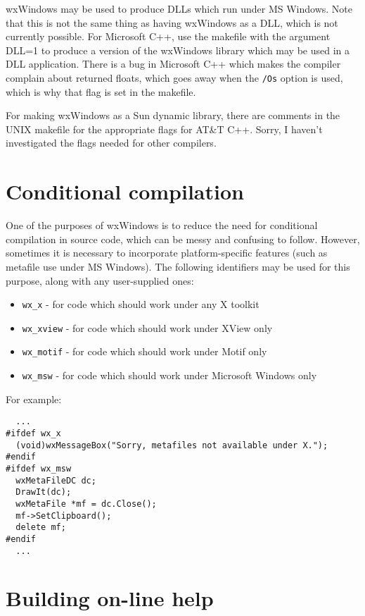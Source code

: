 wxWindows may be used to produce DLLs which run under MS Windows. Note that
this is not the same thing as having wxWindows as a DLL, which is not
currently possible. For Microsoft C++, use the makefile with the argument DLL=1 to produce
a version of the wxWindows library which may be used in a DLL application.
There is a bug in Microsoft C++ which makes the compiler complain about returned floats,
which goes away when the {\tt /Os} option is used, which is why that flag is
set in the makefile.

For making wxWindows as a Sun dynamic library, there are comments in the
UNIX makefile for the appropriate flags for AT\&T C++. Sorry, I haven't
investigated the flags needed for other compilers.

\section{Conditional compilation}

One of the purposes of wxWindows is to reduce the need for conditional
compilation in source code, which can be messy and confusing to follow.
However, sometimes it is necessary to incorporate platform-specific
features (such as metafile use under MS Windows). The following identifiers
may be used for this purpose, along with any user-supplied ones:

\begin{itemize}
\item {\tt wx\_x} - for code which should work under any X toolkit
\item {\tt wx\_xview} - for code which should work under XView only
\item {\tt wx\_motif} - for code which should work under Motif only
\item {\tt wx\_msw} - for code which should work under Microsoft Windows only
\end{itemize}

For example:

\begin{verbatim}
  ...
#ifdef wx_x
  (void)wxMessageBox("Sorry, metafiles not available under X.");
#endif
#ifdef wx_msw
  wxMetaFileDC dc;
  DrawIt(dc);
  wxMetaFile *mf = dc.Close();
  mf->SetClipboard();
  delete mf;
#endif
  ...
\end{verbatim}

\section{Building on-line help}

